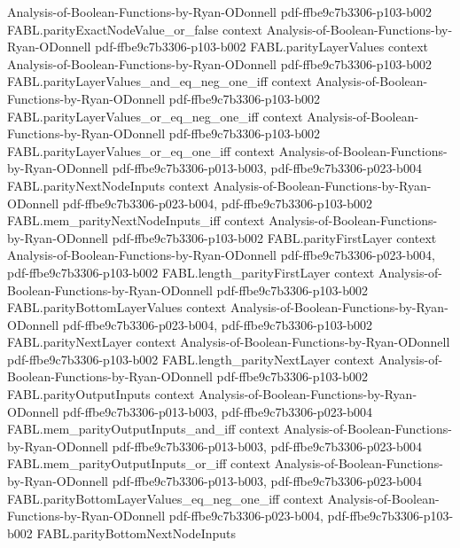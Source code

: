 \begin{theorem}
  {Analysis-of-Boolean-Functions-by-Ryan-ODonnell}
  {pdf-ffbe9c7b3306-p103-b002}
\proofstep
  {FABL.parityExactNodeValue_or_false}
  {context}
  {Analysis-of-Boolean-Functions-by-Ryan-ODonnell}
  {pdf-ffbe9c7b3306-p103-b002}
\proofstep
  {FABL.parityLayerValues}
  {context}
  {Analysis-of-Boolean-Functions-by-Ryan-ODonnell}
  {pdf-ffbe9c7b3306-p103-b002}
\proofstep
  {FABL.parityLayerValues_and_eq_neg_one_iff}
  {context}
  {Analysis-of-Boolean-Functions-by-Ryan-ODonnell}
  {pdf-ffbe9c7b3306-p103-b002}
\proofstep
  {FABL.parityLayerValues_or_eq_neg_one_iff}
  {context}
  {Analysis-of-Boolean-Functions-by-Ryan-ODonnell}
  {pdf-ffbe9c7b3306-p103-b002}
\proofstep
  {FABL.parityLayerValues_or_eq_one_iff}
  {context}
  {Analysis-of-Boolean-Functions-by-Ryan-ODonnell}
  {pdf-ffbe9c7b3306-p013-b003,
    pdf-ffbe9c7b3306-p023-b004}
\proofstep
  {FABL.parityNextNodeInputs}
  {context}
  {Analysis-of-Boolean-Functions-by-Ryan-ODonnell}
  {pdf-ffbe9c7b3306-p023-b004,
    pdf-ffbe9c7b3306-p103-b002}
\proofstep
  {FABL.mem_parityNextNodeInputs_iff}
  {context}
  {Analysis-of-Boolean-Functions-by-Ryan-ODonnell}
  {pdf-ffbe9c7b3306-p103-b002}
\proofstep
  {FABL.parityFirstLayer}
  {context}
  {Analysis-of-Boolean-Functions-by-Ryan-ODonnell}
  {pdf-ffbe9c7b3306-p023-b004,
    pdf-ffbe9c7b3306-p103-b002}
\proofstep
  {FABL.length_parityFirstLayer}
  {context}
  {Analysis-of-Boolean-Functions-by-Ryan-ODonnell}
  {pdf-ffbe9c7b3306-p103-b002}
\proofstep
  {FABL.parityBottomLayerValues}
  {context}
  {Analysis-of-Boolean-Functions-by-Ryan-ODonnell}
  {pdf-ffbe9c7b3306-p023-b004,
    pdf-ffbe9c7b3306-p103-b002}
\proofstep
  {FABL.parityNextLayer}
  {context}
  {Analysis-of-Boolean-Functions-by-Ryan-ODonnell}
  {pdf-ffbe9c7b3306-p103-b002}
\proofstep
  {FABL.length_parityNextLayer}
  {context}
  {Analysis-of-Boolean-Functions-by-Ryan-ODonnell}
  {pdf-ffbe9c7b3306-p103-b002}
\proofstep
  {FABL.parityOutputInputs}
  {context}
  {Analysis-of-Boolean-Functions-by-Ryan-ODonnell}
  {pdf-ffbe9c7b3306-p013-b003,
    pdf-ffbe9c7b3306-p023-b004}
\proofstep
  {FABL.mem_parityOutputInputs_and_iff}
  {context}
  {Analysis-of-Boolean-Functions-by-Ryan-ODonnell}
  {pdf-ffbe9c7b3306-p013-b003,
    pdf-ffbe9c7b3306-p023-b004}
\proofstep
  {FABL.mem_parityOutputInputs_or_iff}
  {context}
  {Analysis-of-Boolean-Functions-by-Ryan-ODonnell}
  {pdf-ffbe9c7b3306-p013-b003,
    pdf-ffbe9c7b3306-p023-b004}
\proofstep
  {FABL.parityBottomLayerValues_eq_neg_one_iff}
  {context}
  {Analysis-of-Boolean-Functions-by-Ryan-ODonnell}
  {pdf-ffbe9c7b3306-p023-b004,
    pdf-ffbe9c7b3306-p103-b002}
\proofstep
  {FABL.parityBottomNextNodeInputs}

\end{theorem}
